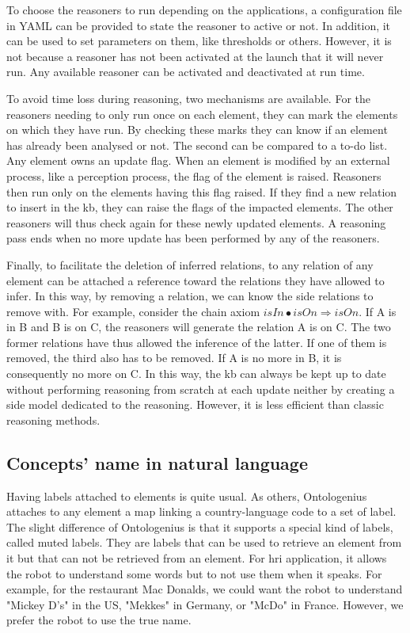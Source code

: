 To choose the reasoners to run depending on the applications, a configuration file in YAML can be provided to state the reasoner to active or not. In addition, it can be used to set parameters on them, like thresholds or others. However, it is not because a reasoner has not been activated at the launch that it will never run. Any available reasoner can be activated and deactivated at run time.

To avoid time loss during reasoning, two mechanisms are available. For the reasoners needing to only run once on each element, they can mark the elements on which they have run. By checking these marks they can know if an element has already been analysed or not. The second can be compared to a to-do list. Any element owns an update flag. When an element is modified by an external process, like a perception process, the flag of the element is raised. Reasoners then run only on the elements having this flag raised. If they find a new relation to insert in the \acrshort{kb}, they can raise the flags of the impacted elements. The other reasoners will thus check again for these newly updated elements. A reasoning pass ends when no more update has been performed by any of the reasoners.

Finally, to facilitate the deletion of inferred relations, to any relation of any element can be attached a reference toward the relations they have allowed to infer. In this way, by removing a relation, we can know the side relations to remove with. For example, consider the chain axiom $isIn \bullet isOn \Rightarrow isOn$. If A is in B and B is on C, the reasoners will generate the relation A is on C. The two former relations have thus allowed the inference of the latter. If one of them is removed, the third also has to be removed. If A is no more in B, it is consequently no more on C. In this way, the \acrshort{kb} can always be kept up to date without performing reasoning from scratch at each update neither by creating a side model dedicated to the reasoning. However, it is less efficient than classic reasoning methods.

\subsection{Concepts' name in natural language}

Having labels attached to elements is quite usual. As others, Ontologenius attaches to any element a map linking a country-language code to a set of label. The slight difference of Ontologenius is that it supports a special kind of labels, called muted labels. They are labels that can be used to retrieve an element from it but that can not be retrieved from an element. For \acrshort{hri} application, it allows the robot to understand some words but to not use them when it speaks. For example, for the restaurant Mac Donalds, we could want the robot to understand "Mickey D's" in the US, "Mekkes" in Germany, or "McDo" in France. However, we prefer the robot to use the true name.

